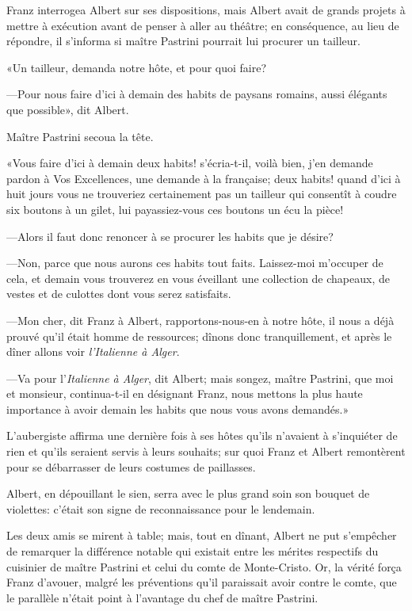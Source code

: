 Franz interrogea Albert sur ses dispositions, mais Albert avait de grands projets à mettre à exécution avant de penser à aller au théâtre; en conséquence, au lieu de répondre, il s'informa si maître Pastrini pourrait lui procurer un tailleur. 

«Un tailleur, demanda notre hôte, et pour quoi faire? 

—Pour nous faire d'ici à demain des habits de paysans romains, aussi élégants que possible», dit Albert. 

Maître Pastrini secoua la tête. 

«Vous faire d'ici à demain deux habits! s'écria-t-il, voilà bien, j'en demande pardon à Vos Excellences, une demande à la française; deux habits! quand d'ici à huit jours vous ne trouveriez certainement pas un tailleur qui consentît à coudre six boutons à un gilet, lui payassiez-vous ces boutons un écu la pièce!  

—Alors il faut donc renoncer à se procurer les habits que je désire? 

—Non, parce que nous aurons ces habits tout faits. Laissez-moi m'occuper de cela, et demain vous trouverez en vous éveillant une collection de chapeaux, de vestes et de culottes dont vous serez satisfaits. 

—Mon cher, dit Franz à Albert, rapportons-nous-en à notre hôte, il nous a déjà prouvé qu'il était homme de ressources; dînons donc tranquillement, et après le dîner allons voir \textit{l'Italienne à Alger}. 

—Va pour l'\textit{Italienne à Alger}, dit Albert; mais songez, maître Pastrini, que moi et monsieur, continua-t-il en désignant Franz, nous mettons la plus haute importance à avoir demain les habits que nous vous avons demandés.» 

L'aubergiste affirma une dernière fois à ses hôtes qu'ils n'avaient à s'inquiéter de rien et qu'ils seraient servis à leurs souhaits; sur quoi Franz et Albert remontèrent pour se débarrasser de leurs costumes de paillasses. 

Albert, en dépouillant le sien, serra avec le plus grand soin son bouquet de violettes: c'était son signe de reconnaissance pour le lendemain. 

Les deux amis se mirent à table; mais, tout en dînant, Albert ne put s'empêcher de remarquer la différence notable qui existait entre les mérites respectifs du cuisinier de maître Pastrini et celui du comte de Monte-Cristo. Or, la vérité força Franz d'avouer, malgré les préventions qu'il paraissait avoir contre le comte, que le parallèle n'était point à l'avantage du chef de maître Pastrini. 

